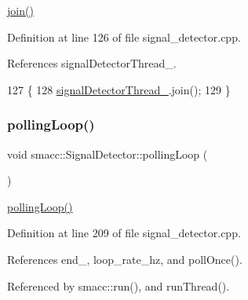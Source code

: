 \hyperlink{classsmacc_1_1SignalDetector_a636f704e469bf74b4a9fdb15bd63d5be}{join()} 

Definition at line 126 of file signal\+\_\+detector.\+cpp.



References signal\+Detector\+Thread\+\_\+.


\begin{DoxyCode}
127 \{
128     \hyperlink{classsmacc_1_1SignalDetector_a4346a400cd37eafc5d1d2e63d975785e}{signalDetectorThread\_}.join();
129 \}
\end{DoxyCode}
\mbox{\label{classsmacc_1_1SignalDetector_a2665e66cdae9f6533c64bbcecf3fa199}} 
\subsubsection{\texorpdfstring{polling\+Loop()}{pollingLoop()}}
{\footnotesize\ttfamily void smacc\+::\+Signal\+Detector\+::polling\+Loop (\begin{DoxyParamCaption}{ }\end{DoxyParamCaption})}

\hyperlink{classsmacc_1_1SignalDetector_a2665e66cdae9f6533c64bbcecf3fa199}{polling\+Loop()} 

Definition at line 209 of file signal\+\_\+detector.\+cpp.



References end\+\_\+, loop\+\_\+rate\+\_\+hz, and poll\+Once().



Referenced by smacc\+::run(), and run\+Thread().


